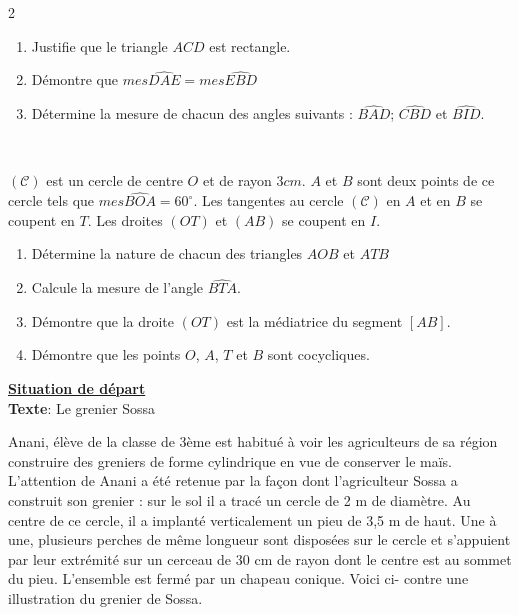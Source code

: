 \begin{multicols}{2}
\begin{center}
  	\end{center}
  	\begin{enumerate}
  		\item Justifie que le triangle $ACD$ est rectangle.
  		\item Démontre que $mes\widehat{DAE}=mes\widehat{EBD}$ 
  		\item Détermine la mesure de chacun des angles suivants : $\widehat{BAD}$;  $\widehat{CBD}$ et  $\widehat{BID}$.
  	\end{enumerate}
  	
  	\begin{center}
  		\\
  	\end{center}
  	$\mathcal{(C)}$ est un cercle de centre $O$ et de rayon $3cm$. $A$ et $B$ sont deux points de ce cercle tels que $mes\widehat{BOA}=60^\circ$. Les tangentes au 
  	cercle $\mathcal{(C)}$ en $A$ et en $B$ se coupent en $T$. Les droites $(OT)$ et $(AB)$ se coupent en $I$.
  	\begin{enumerate}
  		\item Détermine la nature de chacun des triangles $AOB$ et $ATB$
  		\item  Calcule la mesure de l’angle $\widehat{BTA}$.
  		\item Démontre que la droite $(OT)$ est la médiatrice du segment $[AB]$.
  		\item  Démontre que les points $O$, $A$, $T$ et $B$ sont cocycliques. 
  	\end{enumerate}
  	\underline{\textbf{Situation de départ}} \\
  	\textbf{Texte}: Le grenier Sossa
  	
  	\hspace{0.4cm} Anani, élève de la classe de 3ème est habitué à voir les 
  	agriculteurs de sa région construire des greniers de forme 
  	cylindrique en vue de conserver le maïs.
  	L’attention de Anani a été retenue par la façon dont 
  	l’agriculteur Sossa a construit son grenier : sur le sol il a tracé un 
  	cercle de 2 m de diamètre. Au centre de ce cercle, il a implanté 
  	verticalement un pieu de 3,5 m de haut. Une à une, plusieurs 
  	perches de même longueur sont disposées sur le cercle et 
  	s’appuient par leur extrémité sur un cerceau de 
  	30 cm de rayon dont le centre est au sommet du pieu. L’ensemble 
  	est fermé par un chapeau conique. 
  	Voici ci- contre une illustration du grenier de Sossa.
  	

\end{multicols}
